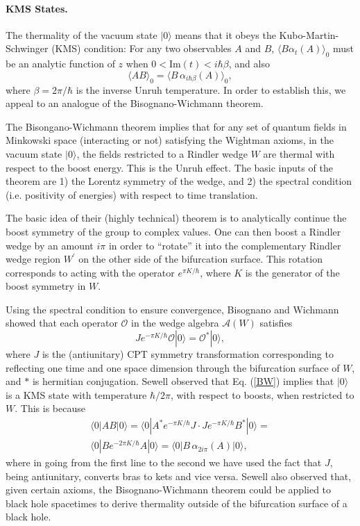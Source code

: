 \documentclass[12pt]{article}
\begin{document}
\paragraph{KMS States.}  The thermality of the vacuum state $|0\rangle$ means that it obeys the Kubo-Martin-Schwinger (KMS) condition: For any two observables $A$ and $B$, $\langle B \alpha_{t}(A) \rangle_0$ must be an analytic function of $z$ when $0 < \textrm{Im}(t) < i \hbar \beta$, and also
\begin{equation}\label{KMS}
\langle AB \rangle_0 = \langle B\,\alpha_{i \hbar \beta}(A) \rangle_0,
\end{equation}
where $\beta = 2\pi / \hbar$ is the inverse Unruh temperature.  In order to establish this, we appeal to an analogue of the Bisognano-Wichmann theorem.

The Bisongano-Wichmann theorem \cite{BW76} implies that for any set of quantum fields in Minkowski space (interacting or not) satisfying the Wightman axioms, in the vacuum state $|0\rangle$, the fields restricted to a Rindler wedge $W$ are thermal with respect to the boost energy.  This is the Unruh effect.  The basic inputs of the theorem are 1) the Lorentz symmetry of the wedge, and 2) the spectral condition (i.e. positivity of energies) with respect to time translation.

The basic idea of their (highly technical) theorem is to analytically continue the boost symmetry of the group to complex values.  One can then boost a Rindler wedge by an amount $i\pi$ in order to ``rotate'' it into the complementary Rindler wedge region $W^\prime$ on the other side of the bifurcation surface.  This rotation corresponds to acting with the operator $e^{\pi K /\hbar}$, where $K$ is the generator of the boost symmetry in $W$.

Using the spectral condition to ensure convergence, Bisognano and Wichmann showed that each operator $\mathcal{O}$ in the wedge algebra $\mathcal{A}(W)$ satisfies
\begin{equation}\label{BW}
J e^{-\pi K / \hbar} \mathcal{O} |0\rangle = \mathcal{O}^* |0\rangle,
\end{equation}
where $J$ is the (antiunitary) CPT symmetry transformation corresponding to reflecting one time and one space dimension through the bifurcation surface of $W$, and $*$ is hermitian conjugation.  Sewell \cite{sewell80} observed that Eq. (\ref{BW}) implies that $|0\rangle$ is a KMS state with temperature $\hbar / 2\pi$, with respect to boosts, when restricted to $W$.  This is because
\begin{eqnarray}
\langle 0| AB |0\rangle = \langle 0| A^* e^{-\pi K/\hbar} J \cdot J e^{-\pi K/\hbar} B^* |0\rangle = \\
\langle 0| B e^{-2\pi K/\hbar} A |0\rangle = \langle 0| B\,\alpha_{2i\pi}(A) |0\rangle,
\end{eqnarray}
where in going from the first line to the second we have used the fact that $J$, being antiunitary, converts bras to kets and vice versa.  Sewell also observed that, given certain axioms, the Bisognano-Wichmann theorem could be applied to black hole spacetimes to derive thermality outside of the bifurcation surface of a black hole.
\end{document}
